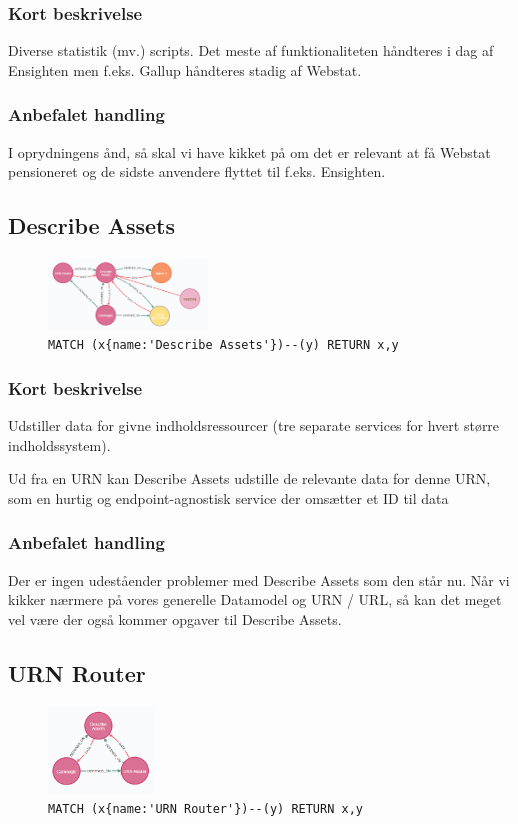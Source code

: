 \documentclass{article}
\begin{document}
\subsubsection*{Kort beskrivelse}
Diverse statistik (mv.) scripts. Det meste af funktionaliteten håndteres i dag af Ensighten men f.eks. Gallup håndteres stadig af Webstat.
\subsubsection*{Anbefalet handling}
I oprydningens ånd, så skal vi have kikket på om det er relevant at få Webstat pensioneret og de sidste anvendere flyttet til f.eks. Ensighten.


\subsection{Describe Assets}
\begin{figure}[H]
\includegraphics[width=120pt]{DescribeAssets.PNG}
\cprotect\caption{\verb|MATCH (x{name:'Describe Assets'})--(y) RETURN x,y|}
\end{figure}
\subsubsection*{Kort beskrivelse}
Udstiller data for givne indholdsressourcer (tre separate services for hvert større indholdssystem).

Ud fra en URN kan Describe Assets udstille de relevante data for denne URN, som en hurtig og endpoint-agnostisk service der omsætter et ID til data
\subsubsection*{Anbefalet handling}
Der er ingen udeståender problemer med Describe Assets som den står nu. Når vi kikker nærmere på vores generelle Datamodel og URN / URL, så kan det meget vel være der også kommer opgaver til Describe Assets.


\subsection{URN Router}
\begin{figure}[H]
\includegraphics[width=80pt]{URNRouter.PNG}
\cprotect\caption{\verb|MATCH (x{name:'URN Router'})--(y) RETURN x,y|}
\end{figure}
\end{document}
